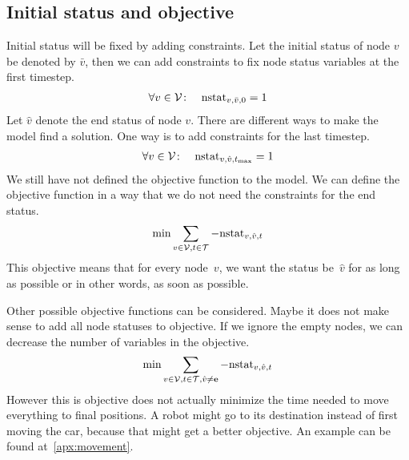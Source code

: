 \subsection{Initial status and objective}
\newcommand{\initW}[1]{\bar{#1}}
\newcommand{\termW}[1]{\hat{#1}}
Initial status will be fixed by adding constraints. Let the initial status of
node $v$ be denoted by $\initW{v}$, then we can add constraints to fix node
status variables at the first timestep.
\begin{align}
    &\forall v \in \V\colon &\nstat_{v,\initW{v},0} = 1
\end{align}
Let $\termW{v}$ denote the end status of node $v$. There are different ways to make
the model find a solution. One way is to add constraints for the last timestep.
\begin{align}
    \label{eq:termcont}
    &\forall v \in \V\colon &\nstat_{v,\termW{v},t_{\max}} = 1
\end{align}
We still have not defined the objective function to the model. We can
define the objective function in a way that we do not need the constraints for
the end status.
\begin{align}
    \min \sum_{v \in \V,t \in \T} -\nstat_{v,\termW{v},t}
\end{align}
This objective means that for every node~$v$, we want the status be~$\termW{v}$
for as long as possible or in other words, as soon as possible.

Other possible objective functions can be considered. Maybe it does not make
sense to add all node statuses to objective. If we ignore the empty nodes, we
can decrease the number of variables in the objective.
\begin{align}
    \label{eq:timeobj}
    \min \sum_{v \in \V,t \in \T,\termW{v} \neq \stat{e}}
    -\nstat_{v,\termW{v},t}
\end{align}
However this is objective does not actually minimize the time needed to move
everything to final positions. A robot might go to its destination instead of
first moving the car, because that might get a better objective. An example can
be found at~\autoref{apx:movement}.

